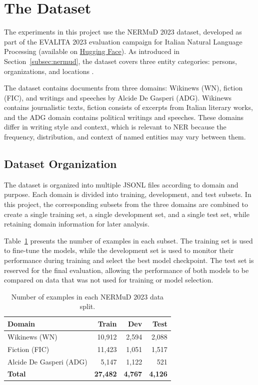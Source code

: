 \section{The Dataset}
\label{sec:dataset}

The experiments in this project use the NERMuD 2023 dataset, developed as part of the EVALITA 2023 evaluation campaign for Italian Natural Language Processing (available on \href{https://huggingface.co/datasets/evalitahf/entity_recognition}{Hugging Face}). As introduced in Section~\ref{subsec:nermud}, the dataset covers three entity categories: persons, organizations, and locations \cite{palmeroaprosio2023nermud}.

The dataset contains documents from three domains: Wikinews (WN), fiction (FIC), and writings and speeches by Alcide De Gasperi (ADG). Wikinews contains journalistic texts, fiction consists of excerpts from Italian literary works, and the ADG domain contains political writings and speeches. These domains differ in writing style and context, which is relevant to NER because the frequency, distribution, and context of named entities may vary between them.

\subsection{Dataset Organization}
\label{subsec:data-org}

The dataset is organized into multiple JSONL files according to domain and purpose. Each domain is divided into training, development, and test subsets. In this project, the corresponding subsets from the three domains are combined to create a single training set, a single development set, and a single test set, while retaining domain information for later analysis.

Table~\ref{tab:dataset-splits} presents the number of examples in each subset. The training set is used to fine-tune the models, while the development set is used to monitor their performance during training and select the best model checkpoint. The test set is reserved for the final evaluation, allowing the performance of both models to be compared on data that was not used for training or model selection.

\begin{table}[H]
    \centering
    \caption{Number of examples in each NERMuD 2023 data split.}
    \label{tab:dataset-splits}
    \begin{tabular}{lrrr}
        \hline
        \textbf{Domain} & \textbf{Train} & \textbf{Dev} & \textbf{Test} \\
        \hline
        Wikinews (WN) & 10,912 & 2,594 & 2,088 \\
        Fiction (FIC) & 11,423 & 1,051 & 1,517 \\
        Alcide De Gasperi (ADG) & 5,147 & 1,122 & 521 \\
        \hline
        \textbf{Total} & \textbf{27,482} & \textbf{4,767} & \textbf{4,126} \\
        \hline
    \end{tabular}
\end{table}

